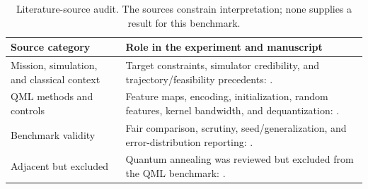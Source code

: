 \begin{table}[t]
\caption{Literature-source audit. The sources constrain interpretation; none supplies a result for this benchmark.}
\label{tab:literature-audit}
\centering
\scriptsize
\setlength{\tabcolsep}{2pt}
\renewcommand{\arraystretch}{0.90}
\begin{tabularx}{\textwidth}{@{}p{}X@{}}
\toprule
Source category & Role in the experiment and manuscript \\
\midrule
Mission, simulation, and classical context & Target constraints, simulator credibility, and trajectory/feasibility precedents: \cite{woffinden2023,nasa7009,nasa3001,zavoli2020,sullivan2021,izzo2021,steffen2025,xie2022,zhang2025}. \\
QML methods and controls & Feature maps, encoding, initialization, random features, kernel bandwidth, and dequantization: \cite{schuld2019,havlicek2019,perez2020,skolik2022,caro2021,grant2019,otten2020,shaydulin2022,huang2021,rahimi2007,sweke2025}. \\
Benchmark validity & Fair comparison, scrutiny, seed/generalization, and error-distribution reporting: \cite{bowles2024,schnabel2024,peters2023,pernot2020}. \\
Adjacent but excluded & Quantum annealing was reviewed but excluded from the QML benchmark: \cite{degrossi2025}. \\
\bottomrule
\end{tabularx}
\renewcommand{\arraystretch}{1}
\end{table}
